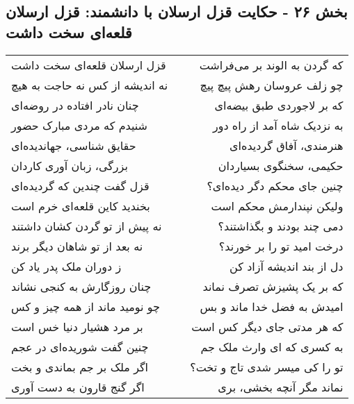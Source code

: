 \begin{center}
\section*{بخش ۲۶ - حکایت قزل ارسلان با دانشمند: قزل ارسلان قلعه‌ای سخت داشت}
\label{sec:026}
\begin{longtable}{l p{0.5cm} r}
قزل ارسلان قلعه‌ای سخت داشت
&&
که گردن به الوند بر می‌فراشت
\\
نه اندیشه از کس نه حاجت به هیچ
&&
چو زلف عروسان رهش پیچ پیچ
\\
چنان نادر افتاده در روضه‌ای
&&
که بر لاجوردی طبق بیضه‌ای
\\
شنیدم که مردی مبارک حضور
&&
به نزدیک شاه آمد از راه دور
\\
حقایق شناسی، جهاندیده‌ای
&&
هنرمندی، آفاق گردیده‌ای
\\
بزرگی، زبان آوری کاردان
&&
حکیمی، سخنگوی بسیاردان
\\
قزل گفت چندین که گردیده‌ای
&&
چنین جای محکم دگر دیده‌ای؟
\\
بخندید کاین قلعه‌ای خرم است
&&
ولیکن نپندارمش محکم است
\\
نه پیش از تو گردن کشان داشتند
&&
دمی چند بودند و بگذاشتند؟
\\
نه بعد از تو شاهان دیگر برند
&&
درخت امید تو را بر خورند؟
\\
ز دوران ملک پدر یاد کن
&&
دل از بند اندیشه آزاد کن
\\
چنان روزگارش به کنجی نشاند
&&
که بر یک پشیزش تصرف نماند
\\
چو نومید ماند از همه چیز و کس
&&
امیدش به فضل خدا ماند و بس
\\
بر مرد هشیار دنیا خس است
&&
که هر مدتی جای دیگر کس است
\\
چنین گفت شوریده‌ای در عجم
&&
به کسری که ای وارث ملک جم
\\
اگر ملک بر جم بماندی و بخت
&&
تو را کی میسر شدی تاج و تخت؟
\\
اگر گنج قارون به دست آوری
&&
نماند مگر آنچه بخشی، بری
\\
\end{longtable}
\end{center}
